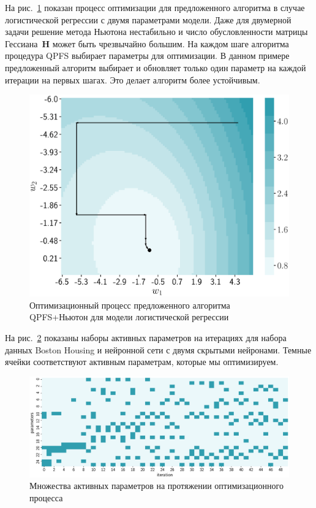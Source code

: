 \documentclass[a4paper,12pt]{article}
\theoremstyle{plain} %
\theoremstyle{definition} %
\theoremstyle{remark} %
\newcommand{\bH}{\mathbf{H}}
\begin{document}
	На рис.~\ref{fig:irls_qpfs_2d} показан процесс оптимизации для предложенного алгоритма в случае логистической регрессии с двумя параметрами модели. 
	Даже для двумерной задачи решение метода Ньютона нестабильно и число обусловленности матрицы Гессиана~$\bH$ может быть чрезвычайно большим. 
	На каждом шаге алгоритма процедура QPFS выбирает параметры для оптимизации. 
	В данном примере предложенный алгоритм выбирает и обновляет только один параметр на каждой итерации на первых шагах. 
	Это делает алгоритм более устойчивым.

	\begin{figure}[!h]
		\centering
		\includegraphics[width=0.6\linewidth]{figs/irls_qpfs_2d}	 
		\caption{Оптимизационный процесс предложенного алгоритма QPFS+Ньютон для модели логистической регрессии}
		\label{fig:irls_qpfs_2d}
	\end{figure}
	
	На рис.~\ref{fig:active_params_wrt_iters} показаны наборы активных параметров на итерациях для набора данных Boston Housing и нейронной сети с двумя скрытыми нейронами. 
	Темные ячейки соответствуют активным параметрам, которые мы оптимизируем.
	
	\begin{figure}[!h]
		\centering
		\includegraphics[width=\linewidth]{figs/active_params_wrt_iters}	
		\caption{Множества активных параметров на протяжении оптимизационного процесса}
		\label{fig:active_params_wrt_iters}
	\end{figure}
	
\end{document}

